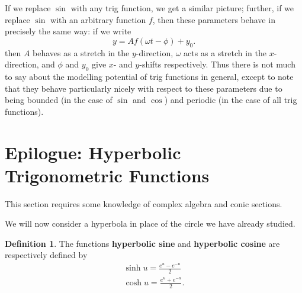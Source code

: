 \documentclass[a4paper,leqno]{article}
\numberwithin{equation}{section}
\theoremstyle{definition}
\newtheorem{defn}[equation]{Definition}
\theoremstyle{remark}
\newcommand{\df}[1]{\textbf{#1}}
\begin{document}
\begin{center}
\end{center}

If we replace $ \sin $ with any trig function, we get a similar picture; further, if we replace $ \sin $
with an arbitrary function $ f $, then these parameters behave in precisely the same way: if we write
\begin{equation}
  y = Af(\omega t - \phi) + y_0.
\end{equation}
then $ A $ behaves as a stretch in the $ y$-direction, $ \omega $ acts as a stretch in the $ x$-direction,
and $ \phi $ and $ y_0 $ give $ x$- and $ y$-shifts respectively. Thus there is not much to say about
the modelling potential of trig functions in general, except to note that they behave particularly nicely
with respect to these parameters due to being bounded (in the case of $ \sin $ and $ \cos $) and periodic
(in the case of all trig functions).

\section{Epilogue: Hyperbolic Trigonometric Functions}
\begin{center}
  This section requires some knowledge of complex algebra and conic sections.
\end{center}
We will now consider a hyperbola in place of the circle we have already studied.
\begin{defn}
  The functions \df{hyperbolic sine} and \df{hyperbolic cosine} are respectively defined by
  \begin{gather*}
    \sinh u = \frac{e^u - e^{-u}}{2}\\
    \cosh u = \frac{e^u + e^{-u}}{2}.
  \end{gather*}
\end{defn}
\end{document}
